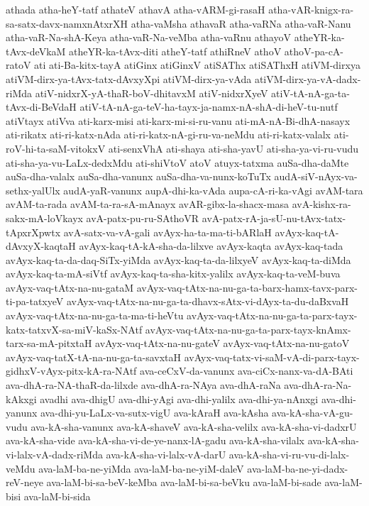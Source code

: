 {athada
atha-heY-tatf
athateV
athavA
atha-vARM-gi-rasaH
atha-vAR-knigx-ra-sa-satx-davx-namxnAtxrXH
atha-vaMsha
athavaR
atha-vaRNa
atha-vaR-Nanu
atha-vaR-Na-shA-Keya
atha-vaR-Na-veMba
atha-vaRnu
athayoV
atheYR-ka-tAvx-deVkaM
atheYR-ka-tAvx-diti
atheY-tatf
athiRneV
athoV
athoV-pa-cA-ratoV
ati
ati-Ba-kitx-tayA
atiGinx
atiGinxV
atiSAThx
atiSAThxH
atiVM-dirxya
atiVM-dirx-ya-tAvx-tatx-dAvxyXpi
atiVM-dirx-ya-vAda
atiVM-dirx-ya-vA-dadx-riMda
atiV-nidxrX-yA-thaR-boV-dhitavxM
atiV-nidxrXyeV
atiV-tA-nA-ga-ta-tAvx-di-BeVdaH
atiV-tA-nA-ga-teV-ha-tayx-ja-namx-nA-shA-di-heV-tu-nutf
atiVtayx
atiVva
ati-karx-misi
ati-karx-mi-si-ru-vanu
ati-mA-nA-Bi-dhA-nasayx
ati-rikatx
ati-ri-katx-nAda
ati-ri-katx-nA-gi-ru-va-neMdu
ati-ri-katx-valalx
ati-roV-hi-ta-saM-vitokxV
ati-senxVhA
ati-shaya
ati-sha-yavU
ati-sha-ya-vi-ru-vudu
ati-sha-ya-vu-LaLx-dedxMdu
ati-shiVtoV
atoV
atuyx-tatxma
auSa-dha-daMte
auSa-dha-valalx
auSa-dha-vanunx
auSa-dha-va-nunx-koTuTx
audA-siV-nAyx-va-sethx-yalUlx
audA-yaR-vanunx
aupA-dhi-ka-vAda
aupa-cA-ri-ka-vAgi
avAM-tara
avAM-ta-rada
avAM-ta-ra-sA-mAnayx
avAR-gibx-la-shacx-masa
avA-kishx-ra-sakx-mA-loVkayx
avA-patx-pu-ru-SAthoVR
avA-patx-rA-ja-sU-nu-tAvx-tatx-tApxrXpwtx
avA-satx-va-vA-gali
avAyx-ha-ta-ma-ti-bARlaH
avAyx-kaq-tA-dAvxyX-kaqtaH
avAyx-kaq-tA-kA-sha-da-lilxve
avAyx-kaqta
avAyx-kaq-tada
avAyx-kaq-ta-da-daq-SiTx-yiMda
avAyx-kaq-ta-da-lilxyeV
avAyx-kaq-ta-diMda
avAyx-kaq-ta-mA-siVtf
avAyx-kaq-ta-sha-kitx-yalilx
avAyx-kaq-ta-veM-buva
avAyx-vaq-tAtx-na-nu-gataM
avAyx-vaq-tAtx-na-nu-ga-ta-barx-hamx-tavx-parx-ti-pa-tatxyeV
avAyx-vaq-tAtx-na-nu-ga-ta-dhavx-sAtx-vi-dAyx-ta-du-daBxvaH
avAyx-vaq-tAtx-na-nu-ga-ta-ma-ti-heVtu
avAyx-vaq-tAtx-na-nu-ga-ta-parx-tayx-katx-tatxvX-sa-miV-kaSx-NAtf
avAyx-vaq-tAtx-na-nu-ga-ta-parx-tayx-knAmx-tarx-sa-mA-pitxtaH
avAyx-vaq-tAtx-na-nu-gateV
avAyx-vaq-tAtx-na-nu-gatoV
avAyx-vaq-tatX-tA-na-nu-ga-ta-savxtaH
avAyx-vaq-tatx-vi-saM-vA-di-parx-tayx-gidhxV-vAyx-pitx-kA-ra-NAtf
ava-ceCxV-da-vanunx
ava-ciCx-nanx-va-dA-BAti
ava-dhA-ra-NA-thaR-da-lilxde
ava-dhA-ra-NAya
ava-dhA-raNa
ava-dhA-ra-Na-kAkxgi
avadhi
ava-dhigU
ava-dhi-yAgi
ava-dhi-yalilx
ava-dhi-ya-nAnxgi
ava-dhi-yanunx
ava-dhi-yu-LaLx-va-sutx-vigU
ava-kAraH
ava-kAsha
ava-kA-sha-vA-gu-vudu
ava-kA-sha-vanunx
ava-kA-shaveV
ava-kA-sha-velilx
ava-kA-sha-vi-dadxrU
ava-kA-sha-vide
ava-kA-sha-vi-de-ye-nanx-lA-gadu
ava-kA-sha-vilalx
ava-kA-sha-vi-lalx-vA-dadx-riMda
ava-kA-sha-vi-lalx-vA-darU
ava-kA-sha-vi-ru-vu-di-lalx-veMdu
ava-laM-ba-ne-yiMda
ava-laM-ba-ne-yiM-daleV
ava-laM-ba-ne-yi-dadx-reV-neye
ava-laM-bi-sa-beV-keMba
ava-laM-bi-sa-beVku
ava-laM-bi-sade
ava-laM-bisi
ava-laM-bi-sida
}
